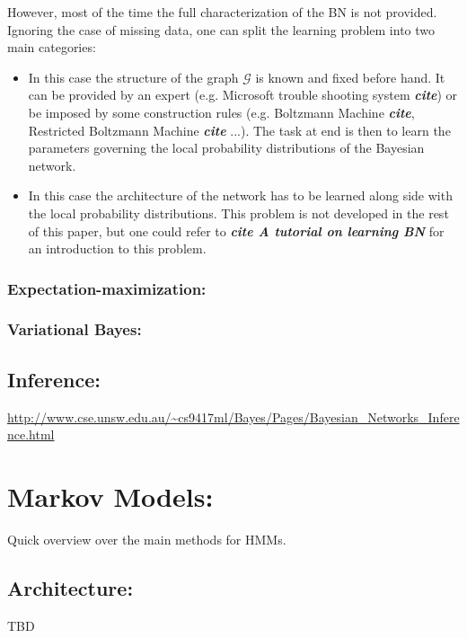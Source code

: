 \documentclass[a4paper,11pt]{report}
\begin{document}
{      However, most of the time the full characterization of the BN is not provided. Ignoring the case of missing data, one can split the learning problem into two main categories:
      \begin{itemize}
				\item {} In this case the structure of the graph $\mathcal{G}$ is known and fixed before hand. It can be provided by an expert (e.g. Microsoft trouble shooting system \textbf{\textit{cite}}) or be imposed by some construction rules (e.g. Boltzmann Machine \textbf{\textit{cite}}, Restricted Boltzmann Machine \textbf{\textit{cite}} ...). The task at end is then to learn the parameters governing the local probability distributions of the Bayesian network.
        \item {} In this case the architecture of the network has to be learned along side with the local probability distributions. This problem is not developed in the rest of this paper, but one could refer to \textbf{\textit{cite A tutorial on learning BN}} for an introduction to this problem.
      \end{itemize}
      
      \subsubsection{Expectation-maximization:}
      
      \subsubsection{Variational Bayes:}

    \subsection{Inference:}
      \label{subseq:PGMs/BN/Inference}
      \url{http://www.cse.unsw.edu.au/~cs9417ml/Bayes/Pages/Bayesian_Networks_Inference.html}
      
  \section{Markov Models:}
    \label{seq:PGMs/MM}
    Quick overview over the main methods for HMMs.
    
    \subsection{Architecture:}
      \label{subseq:PGMs/MM/Architecture}
      TBD

}
\end{document}

